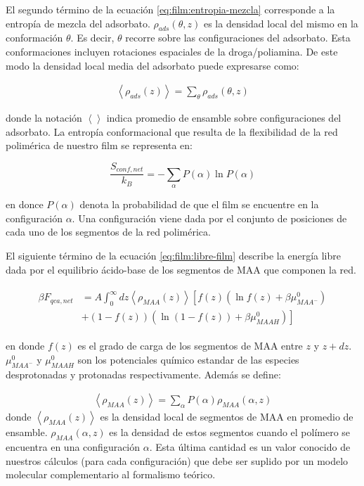 El segundo t\'ermino de la ecuaci\'on \ref{eq:film:entropia-mezcla} corresponde a la entrop\'ia de mezcla del adsorbato. $\rho_{ads}(\theta,z)$ es la densidad local del mismo en la conformaci\'on $\theta$. Es decir, $\theta$ recorre sobre las configuraciones del adsorbato.
Esta conformaciones incluyen rotaciones espaciales de la droga/poliamina.
De este modo la densidad local media del adsorbato  puede expresarse como:


\begin{align}
	\left<\rho_{ads}(z)\right> = \sum_\theta{\rho_{ads}(\theta,z)}
	\label{eq:film:ads-z-theta}
\end{align}

\noindent donde la notaci\'on $\left< \right> $ indica promedio de ensamble sobre configuraciones del adsorbato.
La entrop\'ia conformacional que resulta de la flexibilidad de la red polim\'erica de nuestro film se representa en:

\begin{equation}
	\frac{S_{conf,net}}{k_B} = - \sum_{\alpha}{P(\alpha)\ln P(\alpha)}
\end{equation}

\noindent en donce $P(\alpha)$ denota la probabilidad de que el film se encuentre en la configuraci\'on $\alpha$. Una configuraci\'on viene dada por el conjunto de posiciones de cada uno de los segmentos de la red polim\'erica. 

El siguiente t\'ermino de la ecuaci\'on \ref{eq:film:libre-film} describe  la energ\'ia libre dada por  el equilibrio \'acido-base de los segmentos de MAA que componen la red. 

\begin{align}
	\begin{aligned}
		\beta F_{qca,net} &= A\int_0^\infty dz \left<\rho_{MAA}(z)\right> \left[f(z)(\ln f(z)+ \beta\mu^0_{MAA^-})\right.\\
		&\left.+(1-f(z))(\ln (1-f(z))+\beta\mu^0_{MAAH})\right]    
	\end{aligned}
\end{align} 

\noindent en donde $f(z)$ es el grado de carga de los segmentos de MAA entre  $z$ y $z + dz$. 
$\mu^0_{MAA^-}$ y $\mu^0_{MAAH}$ son los potenciales qu\'imico estandar  de las especies  desprotonadas y protonadas respectivamente.
Adem\'as se define:

\begin{align}
	\left< \rho_{MAA}(z)\right> = \sum_\alpha{P(\alpha)\rho_{MAA}(\alpha,z)}
\end{align}
\noindent donde $\left< \rho_{MAA}(z)\right>$ es la densidad local de segmentos de MAA en promedio de ensamble. $\rho_{MAA}(\alpha,z)$ es la densidad de estos segmentos cuando el pol\'imero se encuentra en una configuraci\'on $\alpha$. Esta \'ultima cantidad es un valor conocido de nuestros c\'alculos (para cada configuraci\'on) que debe ser suplido por un modelo molecular complementario al formalismo te\'orico.


